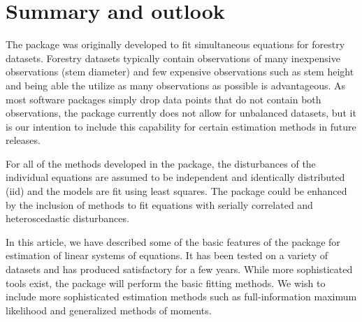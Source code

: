 

\section{Summary and outlook}\label{sec:Summmary}

The  package was originally developed to fit
simultaneous equations for forestry datasets. Forestry datasets
typically contain observations of many inexpensive observations
(stem diameter) and few expensive observations such
as stem height and being able the utilize as many observations as
possible is advantageous.
As most software packages simply drop data points that do not contain
both observations, the  package currently does not
allow for unbalanced datasets, but it is our intention to include this
capability for certain estimation methods in future releases.

For all of the methods developed in the package, the disturbances of
the individual equations are assumed to be independent and identically
distributed (iid) and the models are fit using least squares.  
The package could be enhanced by the inclusion of methods to fit
equations with serially correlated and heteroscedastic disturbances.

In this article, we have described some of the basic features of the
 package for estimation of linear systems of
equations. It has been tested on a variety of datasets and has
produced satisfactory for a few years. While more sophisticated tools
exist, the  package will perform the basic fitting
methods. We wish to include more sophisticated estimation methods such
as full-information maximum likelihood and generalized methods of
moments.


